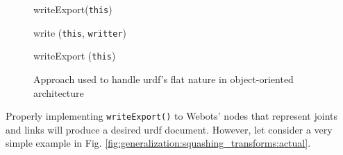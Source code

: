 \begin{figure}[H]
    \begin{minipage}{\linewidth}
    \begin{procedure}[H]
    
        
        
        writeExport(\texttt{this}) \;
        
        \caption{write (\texttt{this}, \texttt{writter})}
    \end{procedure}
    \end{minipage}
    \begin{minipage}{\linewidth}
    \begin{procedure}[H]
        \caption{writeExport (\texttt{this})}
    \end{procedure}
    \end{minipage}
\caption{Approach used to handle \ac{urdf}'s flat nature in object-oriented architecture}
\label{fig:generalization:urdf_flat}
\end{figure}

Properly implementing \texttt{writeExport()} to Webots' nodes that represent joints and links will produce a desired \ac{urdf} document. However, let consider a very simple example in Fig. \ref{fig:generalization:squashing_transforms:actual}.

